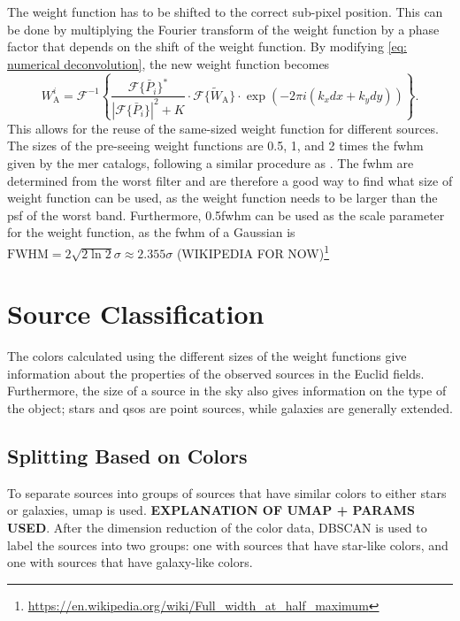 The weight function has to be shifted to the correct sub-pixel position. This can be done by multiplying the Fourier transform of the weight function by a phase factor that depends on the shift of the weight function. By modifying \autoref{eq: numerical deconvolution}, the new weight function becomes
\begin{equation}\label{eq: numerical deconvolution v2}
    W^i_\mathrm{A} = \mathcal{F}^{-1}\left\{\frac{\mathcal{F}\{\bar{P}_i\}^*}{|\mathcal{F}\{\bar{P}_i\}|^2+K}\cdot\mathcal{F}\{\tilde{W}_\mathrm{A}\}\cdot\exp(-2\pi i(k_xdx+k_ydy))\right\}.
\end{equation}
This allows for the reuse of the same-sized weight function for different sources. The sizes of the pre-seeing weight functions are 0.5, 1, and 2 times the \gls{fwhm} given by the \gls{mer} catalogs, following a similar procedure as \cite{euclid_collaboration_euclid_2026}. The \gls{fwhm} are determined from the worst filter and are therefore a good way to find what size of weight function can be used, as the weight function needs to be larger than the \gls{psf} of the worst band. Furthermore, 0.5\gls{fwhm} can be used as the scale parameter for the weight function, as the \gls{fwhm} of a Gaussian is $\mathrm{FWHM}=2\sqrt{2\ln2}\sigma\approx2.355\sigma$ (WIKIPEDIA FOR NOW)\footnote{\url{https://en.wikipedia.org/wiki/Full_width_at_half_maximum}}

\newpage
\section{Source Classification}

The colors calculated using the different sizes of the weight functions give information about the properties of the observed sources in the Euclid fields. Furthermore, the size of a source in the sky also gives information on the type of the object; stars and \glspl{qso} are point sources, while galaxies are generally extended.


\subsection{Splitting Based on Colors}\label{subsec: splitting based on colors}
To separate sources into groups of sources that have similar colors to either stars or galaxies, \gls{umap} is used. \textbf{EXPLANATION OF UMAP + PARAMS USED}. After the dimension reduction of the color data, DBSCAN \citep{ester_density-based_1996} is used to label the sources into two groups: one with sources that have star-like colors, and one with sources that have galaxy-like colors.

